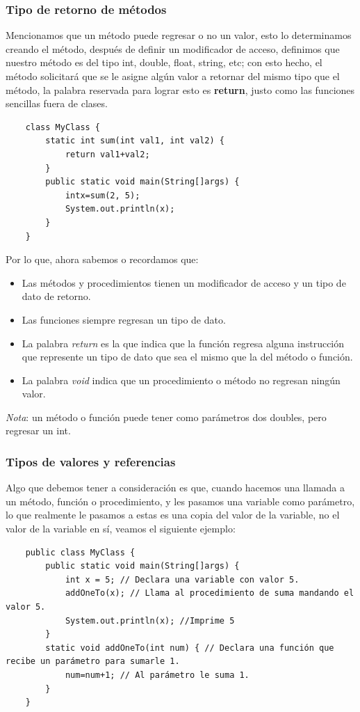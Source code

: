 \subsubsection{Tipo de retorno de métodos}
\hspace{0.55cm}Mencionamos que un método puede regresar o no un valor, esto lo determinamos creando el método, después de definir un modificador de acceso, definimos que nuestro método es del tipo int, double, float, string, etc; con esto hecho, el método solicitará que se le asigne algún valor a retornar del mismo tipo que el método, la palabra reservada para lograr esto es \textbf{return}, justo como las funciones sencillas fuera de clases.
\begin{lstlisting}
    class MyClass {
        static int sum(int val1, int val2) {
            return val1+val2;
        }
        public static void main(String[]args) {
            intx=sum(2, 5);
            System.out.println(x);
        }
    }
\end{lstlisting}

Por lo que, ahora sabemos o recordamos que:
\begin{itemize}
    \item Las métodos y procedimientos tienen un modificador de acceso y un tipo de dato de retorno.
    \item Las funciones siempre regresan un tipo de dato.
    \item La palabra \textit{return} es la que indica que la función regresa alguna instrucción que represente un tipo de dato que sea el mismo que la del método o función.
    \item La palabra \textit{void} indica que un procedimiento o método no regresan ningún valor.
\end{itemize}

\textit{Nota}: un método o función puede tener como parámetros dos doubles, pero regresar un int.


\subsubsection{Tipos de valores y referencias}
\hspace{0.55cm}Algo que debemos tener a consideración es que, cuando hacemos una llamada a un método, función o procedimiento, y les pasamos una variable como parámetro, lo que realmente le pasamos a estas es una copia del valor de la variable, no el valor de la variable en sí, veamos el siguiente ejemplo:
\begin{lstlisting}
    public class MyClass {
        public static void main(String[]args) {
            int x = 5; // Declara una variable con valor 5.
            addOneTo(x); // Llama al procedimiento de suma mandando el valor 5.
            System.out.println(x); //Imprime 5
        }
        static void addOneTo(int num) { // Declara una función que recibe un parámetro para sumarle 1.
            num=num+1; // Al parámetro le suma 1.
        }
    }
\end{lstlisting}

